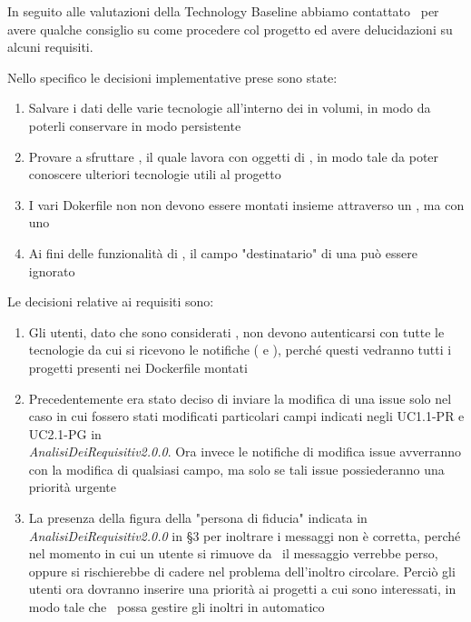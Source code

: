     In seguito alle valutazioni della Technology Baseline abbiamo contattato \DZ\ per avere qualche consiglio su come procedere col progetto ed avere delucidazioni su alcuni requisiti.

    Nello specifico le decisioni implementative prese sono state:
    \begin{enumerate}
        \item Salvare i dati delle varie tecnologie all'interno dei  in volumi, in modo da poterli conservare in modo persistente
        \item Provare a sfruttare , il quale lavora con oggetti di , in modo tale da poter conoscere ulteriori tecnologie utili al progetto
        \item I vari Dokerfile non non devono essere montati insieme attraverso un , ma con uno 
        \item Ai fini delle funzionalità di \progetto, il campo "destinatario" di una  può essere ignorato
    \end{enumerate}

    Le decisioni relative ai requisiti sono:
    \begin{enumerate}
        \item Gli utenti, dato che sono considerati , non devono autenticarsi con tutte le tecnologie da cui si ricevono le notifiche ( e ), perché questi vedranno tutti i progetti presenti nei Dockerfile montati
        \item Precedentemente era stato deciso di inviare la modifica di una issue solo nel caso in cui fossero stati modificati particolari campi indicati negli UC1.1-PR e UC2.1-PG in\\ \textit{AnalisiDeiRequisitiv2.0.0}. Ora invece le notifiche di modifica issue avverranno con la modifica di qualsiasi campo, ma solo se tali issue possiederanno una priorità urgente
        \item La presenza della figura della "persona di fiducia" indicata in \textit{AnalisiDeiRequisitiv2.0.0} in §3 per inoltrare i messaggi non è corretta, perché nel momento in cui un utente si rimuove da \progetto\ il messaggio verrebbe perso, oppure si rischierebbe di cadere nel problema dell'inoltro circolare. Perciò gli utenti ora dovranno inserire una priorità ai progetti a cui sono interessati, in modo tale che \progetto\ possa gestire gli inoltri in automatico
    \end{enumerate}

